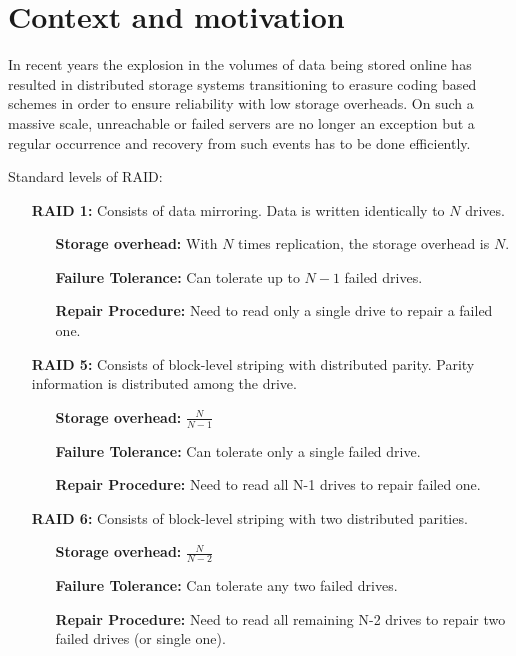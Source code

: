 \chapter{Context and motivation}

In recent years the explosion in the volumes of data being stored online has resulted in distributed storage systems transitioning to erasure coding based schemes in order to ensure reliability with low storage overheads. On such a massive scale, unreachable or failed servers are no longer an exception but a regular occurrence and recovery from such events has to be done efficiently.

Standard levels of RAID:
\begin{itemize}[align = left, leftmargin=*]
\item[\textbf{RAID 1:}] Consists of data mirroring. Data is written identically to $N$ drives.
    \begin{itemize}[align = left, leftmargin=*]
        \item[\textbf{Storage overhead:}] With $N$ times replication, the storage overhead is $N$.
        \item[\textbf{Failure Tolerance:}] Can tolerate up to $N-1$ failed drives.
        \item[\textbf{Repair Procedure:}] Need to read only a single drive to repair a failed one.
    \end{itemize}

\item[\textbf{RAID 5:}] Consists of block-level striping with distributed parity. Parity information is distributed among the drive.
    \begin{itemize}[align = left, leftmargin=*]
        \item[\textbf{Storage overhead:}] $\frac{N}{N-1}$
        \item[\textbf{Failure Tolerance:}] Can tolerate only a single failed drive.
        \item[\textbf{Repair Procedure:}] Need to read all N-1 drives to repair failed one.
    \end{itemize}
\item[\textbf{RAID 6:}] Consists of block-level striping with two distributed parities.
    \begin{itemize}[align = left, leftmargin=*]
        \item[\textbf{Storage overhead:}] $\frac{N}{N-2}$
        \item[\textbf{Failure Tolerance:}] Can tolerate any two failed drives.
        \item[\textbf{Repair Procedure:}] Need to read all remaining N-2 drives to repair two failed drives (or single one).
    \end{itemize}
\end{itemize}


